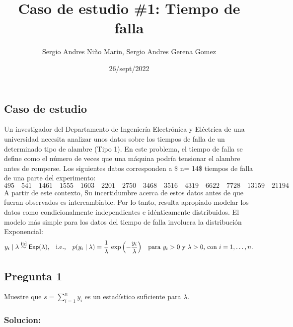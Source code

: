 \documentclass[
]{article}
\title{Caso de estudio \#1: Tiempo de falla}
\author{Sergio Andres Niño Marin, Sergio Andres Gerena Gomez}
\date{26/sept/2022}
\begin{document}
\maketitle

{
\setcounter{tocdepth}{2}
\tableofcontents
}
\hypertarget{caso-de-estudio}{%
\subsection*{Caso de estudio}\label{caso-de-estudio}}

Un investigador del Departamento de Ingeniería Electrónica y Eléctrica
de una universidad necesita analizar unos datos sobre los tiempos de
falla de un determinado tipo de alambre (Tipo 1). En este problema, el
tiempo de falla se define como el número de veces que una máquina podría
tensionar el alambre antes de romperse. Los siguientes datos
corresponden a \$ n= 14\$ tiempos de falla de una parte del experimento:
\[
495 \quad 541 \quad 1461 \quad 1555 \quad 1603 \quad 2201 \quad 2750 \quad 3468 \quad 3516 \quad 4319 \quad 6622 \quad 7728 \quad 13159 \quad 21194
\] A partir de este contexto, Su incertidumbre acerca de estos datos
antes de que fueran observados es intercambiable. Por lo tanto, resulta
apropiado modelar los datos como condicionalmente independientes e
idénticamente distribuidos. El modelo más simple para los datos del
tiempo de falla involucra la distribución Exponencial:
\begin{equation}\label{exponential-model-1}
    y_i \mid \lambda \stackrel{ \mbox{\footnotesize iid} }{ \sim } \textsf{Exp} ( \lambda )\text{,} \ \ \ \textrm{i.e.,} \ \ \ p( y_i \mid \lambda ) = \frac{ 1 }{ \lambda }\, \exp{\left( - \frac{y_i }{ \lambda }\right) } \quad\text{para $y_i > 0$ y $\lambda > 0$, con $i=1,\ldots,n$.} 
\end{equation}

\hypertarget{pregunta-1}{%
\subsection*{Pregunta 1}\label{pregunta-1}}

Muestre que \(s=\sum_{i=1}^n y_i\) es un estadístico suficiente para
\(\lambda\).

\hypertarget{solucion}{%
\subsubsection*{Solucion:}\label{solucion}}
\end{document}
